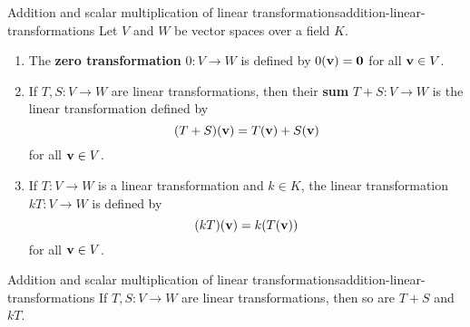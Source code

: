 \begin{definition}{Addition and scalar multiplication of linear transformations}{addition-linear-transformations}
  Let $V$ and $W$ be vector spaces over a field $K$.
  \begin{enumialphparenastyle}
    \begin{enumerate}
    \item The \textbf{zero transformation}%
       $0:V\to W$ is
      defined by $0(\mbox{\bf v})=\mbox{\bf 0}$ for all $\mbox{\bf v}\in V$.
    \item If $T,S:V\to W$ are linear transformations, then their
      \textbf{sum}%
      $T+S:V\to W$ is the linear transformation defined by
      \begin{equation*}
        (T+S)(\mbox{\bf v}) = T(\mbox{\bf v}) + S(\mbox{\bf v})
      \end{equation*}
      for all $\mbox{\bf v}\in V$.
    \item If $T:V\to W$ is a linear transformation and $k\in K$, the
      linear transformation%
      $kT : V\to W$ is defined by
      \begin{equation*}
        (kT)(\mbox{\bf v}) = k(T(\mbox{\bf v}))
      \end{equation*}
      for all $\mbox{\bf v}\in V$.
    \end{enumerate}
  \end{enumialphparenastyle}
\end{definition}

\begin{proposition}{Addition and scalar multiplication of linear transformations}{addition-linear-transformations}
  If $T,S:V\to W$ are linear transformations, then so are $T+S$ and $kT$.
\end{proposition}

